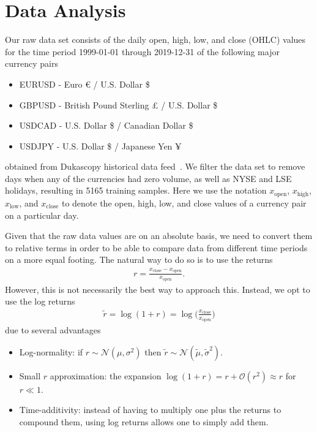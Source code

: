 \section{Data Analysis}
Our raw data set consists of the daily open, high, low, and close (OHLC) values for the time period 1999-01-01 through 2019-12-31 of the following major currency pairs
\begin{itemize}
    \item EURUSD - Euro € / U.S. Dollar \$
    \item GBPUSD - British Pound Sterling £ / U.S. Dollar \$
    \item USDCAD - U.S. Dollar \$ / Canadian Dollar \$
    \item USDJPY - U.S. Dollar \$ / Japanese Yen ¥
\end{itemize}
obtained from Dukascopy historical data feed~\cite{dukascopy}.
We filter the data set to remove days when any of the currencies had zero volume, as well as NYSE and LSE holidays, resulting in 5165 training samples.
Here we use the notation \( x_\text{open} \), \( x_\text{high} \), \( x_\text{low} \), and \( x_\text{close} \) to denote the open, high, low, and close values of a currency pair on a particular day.

Given that the raw data values are on an absolute basis, we need to convert them to relative terms in order to be able to compare data from different time periods on a more equal footing.
The natural way to do so is to use the returns
\begin{align}
    r = \frac{x_\text{close} - x_\text{open}}{x_\text{open}}.
\end{align}
However, this is not necessarily the best way to approach this.
Instead, we opt to use the log returns
\begin{align}
    \tilde{r}
        = \log(1+r)
        = \log\bigg( \frac{x_\text{close}}{x_\text{open}} \bigg)
\end{align}
due to several advantages~\cite{quantivity_2012}
\begin{itemize}
    \item Log-normality: if \( r \sim \mathcal{N}(\mu, \sigma^2) \) then \( \tilde{r} \sim \mathcal{N}(\tilde{\mu}, \tilde{\sigma}^2) \).
    \item Small \( r \) approximation: the expansion \( \log (1 + r) = r + \mathcal{O}(r^2) \approx r \) for \( r \ll 1 \).
    \item Time-additivity: instead of having to multiply one plus the returns to compound them, using log returns allows one to simply add them.
\end{itemize}

